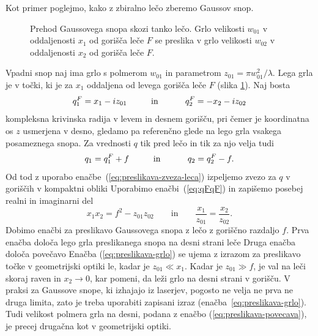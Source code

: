 Kot primer poglejmo, kako z zbiralno lečo zberemo Gaussov snop.
\begin{figure}[h]
\centering
\def\svgwidth{140truemm} 

\caption{Prehod Gaussovega snopa skozi
tanko lečo. Grlo velikosti $w_{01}$ v oddaljenosti $x_{1}$ od gorišča
leče $F$ se preslika v grlo velikosti $w_{02}$ v oddaljenosti $x_{2}$ od gorišča
leče $F$.}
\label{fig:Prehod-Gaussovega-snopa}
\end{figure}

Vpadni snop naj ima grlo s polmerom $w_{01}$ in parametrom $z_{01}=\pi w_{01}^2/\lambda$. 
Lega grla je 
v točki, ki je za $x_{1}$ oddaljena od levega gorišča leče $F$ (slika
\ref{fig:Prehod-Gaussovega-snopa}). Naj bosta 
\begin{equation}
q_{1}^{F}=x_{1}-iz_{01}\mbox{\hskip1cm in \hskip1cm}q_{2}^{F}=-x_{2}-iz_{02}
\label{eq:qFqF}
\end{equation}
 kompleksna krivinska radija v levem in desnem gorišču, pri čemer je koordinatna os $z$ 
 usmerjena v desno, gledamo pa referenčno glede na lego grla vsakega posameznega snopa. 
 Za vrednosti $q$ tik pred lečo in tik za njo velja tudi
\begin{equation}
q_{1}=q_{1}^{F}+f\mbox{\hskip1cm in \hskip1cm}q_{2}=q_{2}^{F}-f.
\end{equation}
 Od tod z uporabo enačbe~(\ref{eq:preslikava-zveza-leca}) izpeljemo zvezo
za $q$ v goriščih v kompaktni obliki 
Uporabimo enačbi~(\ref{eq:qFqF}) in 
zapišemo posebej realni in imaginarni del 
\begin{equation}
x_{1}x_{2}=f^{2}-z_{01}z_{02} \qquad \mathrm{in} \qquad
\frac{x_{1}}{z_{01}}=\frac{x_{2}}{z_{02}}.
\end{equation}
Dobimo enačbi za preslikavo Gaussovega snopa z lečo z goriščno razdaljo $f$.
Prva enačba določa lego grla preslikanega snopa na desni strani leče
Druga enačba določa povečavo
Enačba (\ref{eq:preslikava-grlo}) se ujema z izrazom za preslikavo točke v geometrijski
optiki le, kadar je $z_{01}\ll x_{1}$. Kadar je $z_{01}\gg f$, je
val na leči skoraj raven in $x_2 \to 0$, kar pomeni, da leži
grlo na desni strani v gorišču. V praksi za Gaussove snope, ki izhajajo iz laserjev, pogosto ne
velja ne prva ne druga limita, zato je treba uporabiti zapisani izraz 
(enačba~\ref{eq:preslikava-grlo}).
Tudi velikost polmera grla na desni, podana z enačbo (\ref{eq:preslikava-povecava}),
je precej drugačna kot v geometrijski optiki.

